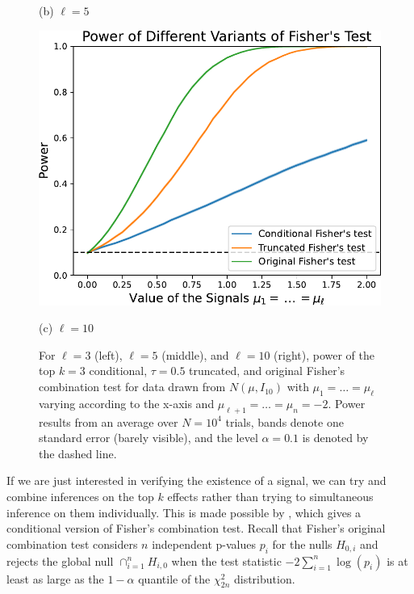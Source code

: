 \documentclass{article}
\begin{document}
\begin{figure}
\begin{minipage}{0.32\textwidth}
        \caption*{(b) $\ell=5$}
    \end{minipage}
    \hfill
    \hspace{0.01\textwidth}
    \begin{minipage}{0.32\textwidth}
        \centering
        \includegraphics[width=\textwidth]{fig/fisher_ell=10.pdf}
        \caption*{(c) $\ell=10$}
    \end{minipage}
    \caption{ For $\ell=3$ (left), $\ell=5$ (middle), and $\ell=10$ (right), power of the top $k=3$ conditional, $\tau=0.5$ truncated, and original Fisher's combination test for data drawn from $N(\mu, I_{10})$ with $\mu_{1}= \dots = \mu_{\ell}$ varying according to the x-axis and $\mu_{\ell + 1} = \dots = \mu_n = -2$. Power results from an average over $N=10^4$ trials, bands denote one standard error (barely visible), and the level $\alpha=0.1$ is denoted by the dashed line.}
    \label{fig:fisher}
\end{figure}

If we are just interested in verifying the existence of a signal, we can try and combine inferences on the top $k$ effects rather than trying to simultaneous inference on them individually. This is made possible by , which gives a conditional version of Fisher's combination test. Recall that Fisher's original combination test considers $n$ independent p-values $p_i$ for the nulls $H_{0, i}$ and rejects the global null $\cap_{i=1}^n H_{i, 0}$ when the test statistic $-2 \sum_{i=1}^n \log(p_i) $ is at least as large as the $1-\alpha$ quantile of the $\chi^2_{2n}$ distribution. 
\end{document}
